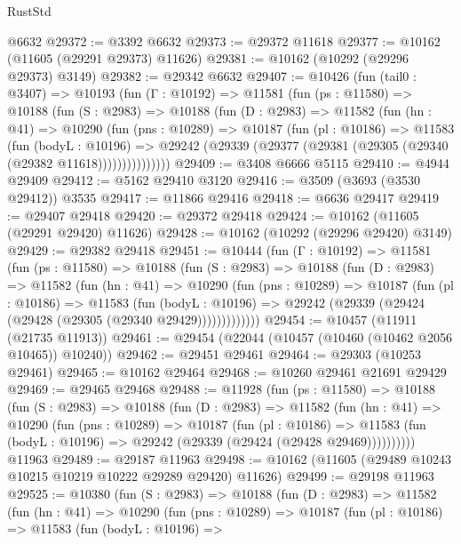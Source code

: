 \begin{lexlean}{RustStd}
\begin{coremodule}
    @6632
@29372 := @3392 @6632
@29373 := @29372 @11618
@29377 := @10162 (@11605 (@29291 @29373) @11626)
@29381 := @10162 (@10292 (@29296 @29373) @3149)
@29382 := @29342 @6632
@29407 := @10426
    (fun (tail0 : @3407) =>
    @10193
      (fun (Γ : @10192) =>
      @11581
        (fun (ps : @11580) =>
        @10188
          (fun (S : @2983) =>
          @10188
            (fun (D : @2983) =>
            @11582
              (fun (hn : @41) =>
              @10290
                (fun (pns : @10289) =>
                @10187
                  (fun (pl : @10186) =>
                  @11583
                    (fun (bodyL : @10196) =>
                    @29242 (@29339 (@29377 (@29381 (@29305 (@29340 (@29382 @11618)))))))))))))))
@29409 := @3408 @6666 @5115
@29410 := @4944 @29409
@29412 := @5162 @29410 @3120
@29416 := @3509 (@3693 (@3530 @29412)) @3535
@29417 := @11866 @29416
@29418 := @6636 @29417
@29419 := @29407 @29418
@29420 := @29372 @29418
@29424 := @10162 (@11605 (@29291 @29420) @11626)
@29428 := @10162 (@10292 (@29296 @29420) @3149)
@29429 := @29382 @29418
@29451 := @10444
    (fun (Γ : @10192) =>
    @11581
      (fun (ps : @11580) =>
      @10188
        (fun (S : @2983) =>
        @10188
          (fun (D : @2983) =>
          @11582
            (fun (hn : @41) =>
            @10290
              (fun (pns : @10289) =>
              @10187
                (fun (pl : @10186) =>
                @11583
                  (fun (bodyL : @10196) =>
                  @29242 (@29339 (@29424 (@29428 (@29305 (@29340 @29429)))))))))))))
@29454 := @10457 (@11911 (@21735 @11913))
@29461 := @29454 (@22044 (@10457 (@10460 (@10462 @2056 @10465)) @10240))
@29462 := @29451 @29461
@29464 := @29303 (@10253 @29461)
@29465 := @10162 @29464
@29468 := @10260 @29461 @21691 @29429
@29469 := @29465 @29468
@29488 := @11928
    (fun (ps : @11580) =>
    @10188
      (fun (S : @2983) =>
      @10188
        (fun (D : @2983) =>
        @11582
          (fun (hn : @41) =>
          @10290
            (fun (pns : @10289) =>
            @10187
              (fun (pl : @10186) =>
              @11583 (fun (bodyL : @10196) => @29242 (@29339 (@29424 (@29428 @29469))))))))))
    @11963
@29489 := @29187 @11963
@29498 := @10162 (@11605 (@29489 @10243 @10215 @10219 @10222 @29289 @29420) @11626)
@29499 := @29198 @11963
@29525 := @10380
    (fun (S : @2983) =>
    @10188
      (fun (D : @2983) =>
      @11582
        (fun (hn : @41) =>
        @10290
          (fun (pns : @10289) =>
          @10187
            (fun (pl : @10186) =>
            @11583
              (fun (bodyL : @10196) =>

\end{coremodule}
\end{lexlean}
